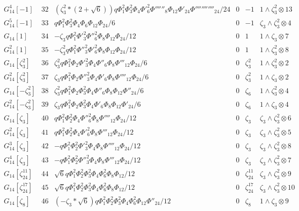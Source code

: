 \documentclass{article}
\begin{document}
$$\begin{array}{c|ccccc}
G_{14}^4[-1]&32&(\zeta_3^2*(2+\sqrt{6}))q\Phi_1^2\Phi_3^2\Phi_4\Phi'_6^2\Phi''''''_8\Phi_{12}\Phi'_{24}\Phi''''''''''''_{24}/24&0&-1&1\!\wedge\!\zeta_3^2\otimes13\\
G_{14}^5[-1]&33&q\Phi_1^2\Phi_3^2\Phi_4\Phi_6\Phi_{12}\Phi_{24}/6&0&-1&\zeta_3\!\wedge\!\zeta_3^2\otimes4\\
G_{14}[1]&34&-\zeta_3q\Phi_1^2\Phi'_3^2\Phi''_6^2\Phi_8\Phi_{12}\Phi_{24}/12&0&1&1\!\wedge\!\zeta_3\otimes7\\
G_{14}^2[1]&35&-\zeta_3^2q\Phi_1^2\Phi''_3^2\Phi'_6^2\Phi_8\Phi_{12}\Phi_{24}/12&0&1&1\!\wedge\!\zeta_3^2\otimes8\\
G_{14}[\zeta_3^2]&36&\zeta_3^2q\Phi_1^2\Phi_2\Phi'_3^2\Phi_4\Phi''_6\Phi_8\Phi'''_{12}\Phi_{24}/6&0&\zeta_3^2&1\!\wedge\!\zeta_3^2\otimes2\\
G_{14}^2[\zeta_3^2]&37&\zeta_3q\Phi_1^2\Phi_2\Phi''_3^2\Phi_4\Phi'_6\Phi_8\Phi''''_{12}\Phi_{24}/6&0&\zeta_3^2&1\!\wedge\!\zeta_3\otimes2\\
G_{14}[-\zeta_3^2]&38&\zeta_3^2q\Phi_1^2\Phi_2\Phi_3^2\Phi_4\Phi''_6\Phi_8\Phi_{12}\Phi''_{24}/6&0&\zeta_6&1\!\wedge\!\zeta_3^2\otimes4\\
G_{14}^2[-\zeta_3^2]&39&\zeta_3q\Phi_1^2\Phi_2\Phi_3^2\Phi_4\Phi'_6\Phi_8\Phi_{12}\Phi'_{24}/6&0&\zeta_6&1\!\wedge\!\zeta_3\otimes4\\
G_{14}[\zeta_3]&40&q\Phi_1^2\Phi_2^2\Phi_4\Phi''_6^2\Phi_8\Phi''''_{12}\Phi_{24}/12&0&\zeta_3&\zeta_3\!\wedge\!\zeta_3^2\otimes6\\
G_{14}^2[\zeta_3]&41&q\Phi_1^2\Phi_2^2\Phi_4\Phi'_6^2\Phi_8\Phi'''_{12}\Phi_{24}/12&0&\zeta_3&\zeta_3\!\wedge\!\zeta_3^2\otimes5\\
G_{14}^3[\zeta_3]&42&-q\Phi_1^2\Phi_2^2\Phi'_3^2\Phi_4\Phi_8\Phi''''_{12}\Phi_{24}/12&0&\zeta_3&\zeta_3\!\wedge\!\zeta_3^2\otimes8\\
G_{14}^4[\zeta_3]&43&-q\Phi_1^2\Phi_2^2\Phi''_3^2\Phi_4\Phi_8\Phi'''_{12}\Phi_{24}/12&0&\zeta_3&\zeta_3\!\wedge\!\zeta_3^2\otimes7\\
G_{14}[\zeta_{24}^{11}]&44&\sqrt{6}q\Phi_1^2\Phi_2^2\Phi_3^2\Phi_4\Phi_6^2\Phi_8\Phi_{12}/12&0&\zeta_{24}^{11}&\zeta_3\!\wedge\!\zeta_3^2\otimes9\\
G_{14}[\zeta_{24}^{17}]&45&\sqrt{6}q\Phi_1^2\Phi_2^2\Phi_3^2\Phi_4\Phi_6^2\Phi_8\Phi_{12}/12&0&\zeta_{24}^{17}&\zeta_3\!\wedge\!\zeta_3^2\otimes10\\
G_{14}[\zeta_8]&46&(-\zeta_3*\sqrt{6})q\Phi_1^2\Phi_2^2\Phi_3^2\Phi_4\Phi_6^2\Phi_{12}\Phi''_{24}/12&0&\zeta_8&1\!\wedge\!\zeta_3\otimes9\\

\end{array}$$
\end{document}
